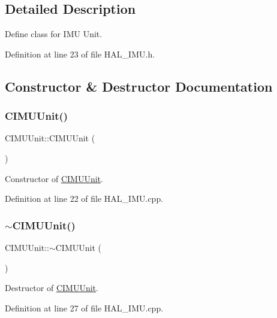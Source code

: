 \subsection{Detailed Description}
Define class for I\+MU Unit. 

Definition at line 23 of file H\+A\+L\+\_\+\+I\+M\+U.\+h.



\subsection{Constructor \& Destructor Documentation}
\mbox{\label{class_c_i_m_u_unit_a642610dac7cbec756f3ef51c5d77c344}} 
\subsubsection{\texorpdfstring{CIMUUnit()}{CIMUUnit()}}
{\footnotesize\ttfamily C\+I\+M\+U\+Unit\+::\+C\+I\+M\+U\+Unit (\begin{DoxyParamCaption}{ }\end{DoxyParamCaption})}



Constructor of \mbox{\hyperlink{class_c_i_m_u_unit}{C\+I\+M\+U\+Unit}}. 



Definition at line 22 of file H\+A\+L\+\_\+\+I\+M\+U.\+cpp.

\mbox{\label{class_c_i_m_u_unit_ad1b0755d9d3f7f25abc660562eba6dfa}} 
\subsubsection{\texorpdfstring{$\sim$CIMUUnit()}{~CIMUUnit()}}
{\footnotesize\ttfamily C\+I\+M\+U\+Unit\+::$\sim$\+C\+I\+M\+U\+Unit (\begin{DoxyParamCaption}{ }\end{DoxyParamCaption})}



Destructor of \mbox{\hyperlink{class_c_i_m_u_unit}{C\+I\+M\+U\+Unit}}. 



Definition at line 27 of file H\+A\+L\+\_\+\+I\+M\+U.\+cpp.



